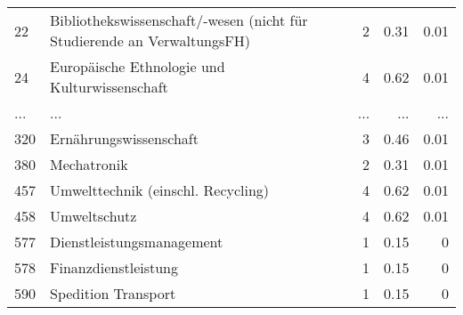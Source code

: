 \begin{longtable}{lXrrr}
        22 & \multicolumn{1}{X}{Bibliothekswissenschaft/-wesen (nicht für Studierende an VerwaltungsFH)} & %
          \num{2} &
          \num[round-mode=places,round-precision=2]{0.31} &
          \num[round-mode=places,round-precision=2]{0.01} \\
        24 & \multicolumn{1}{X}{Europäische Ethnologie und Kulturwissenschaft} & %
          \num{4} &
          \num[round-mode=places,round-precision=2]{0.62} &
          \num[round-mode=places,round-precision=2]{0.01} \\
       ... & ... & ... & ... & ... \\
        320 & \multicolumn{1}{X}{Ernährungswissenschaft} & %
          \num{3} &
          \num[round-mode=places,round-precision=2]{0.46} &
          \num[round-mode=places,round-precision=2]{0.01} \\

        380 & \multicolumn{1}{X}{Mechatronik} & %
          \num{2} &
          \num[round-mode=places,round-precision=2]{0.31} &
          \num[round-mode=places,round-precision=2]{0.01} \\

        457 & \multicolumn{1}{X}{Umwelttechnik (einschl. Recycling)} & %
          \num{4} &
          \num[round-mode=places,round-precision=2]{0.62} &
          \num[round-mode=places,round-precision=2]{0.01} \\

        458 & \multicolumn{1}{X}{Umweltschutz} & %
          \num{4} &
          \num[round-mode=places,round-precision=2]{0.62} &
          \num[round-mode=places,round-precision=2]{0.01} \\

        577 & \multicolumn{1}{X}{Dienstleistungsmanagement} & %
          \num{1} &
          \num[round-mode=places,round-precision=2]{0.15} &
          \num[round-mode=places,round-precision=2]{0} \\

        578 & \multicolumn{1}{X}{Finanzdienstleistung} & %
          \num{1} &
          \num[round-mode=places,round-precision=2]{0.15} &
          \num[round-mode=places,round-precision=2]{0} \\

        590 & \multicolumn{1}{X}{Spedition Transport} & %
          \num{1} &
          \num[round-mode=places,round-precision=2]{0.15} &
          \num[round-mode=places,round-precision=2]{0} \\


\end{longtable}
